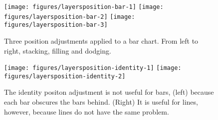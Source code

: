 \begin{Shaded}
\begin{Highlighting}[]
\StringTok{ } 
\StringTok{ }\NormalTok{(} \NormalTok{)}
\StringTok{ }\NormalTok{(} \NormalTok{)}
\StringTok{ }\NormalTok{(} \NormalTok{)}
\end{Highlighting}
\end{Shaded}

\begin{figure}
\texttt{[image: figures/layersposition-bar-1]} \texttt{[image: figures/layersposition-bar-2]} \texttt{[image: figures/layersposition-bar-3]} \caption{Three position adjustments applied to a bar chart.  From left to right, stacking, filling and dodging.\label{fig:position-bar}}
\end{figure}

\begin{Shaded}
\begin{Highlighting}[]
\StringTok{ }\NormalTok{(} \NormalTok{)}
 \NormalTok{, } 
  \NormalTok{, }
\end{Highlighting}
\end{Shaded}

\begin{figure}
\texttt{[image: figures/layersposition-identity-1]} \texttt{[image: figures/layersposition-identity-2]} \caption{The identity positon adjustment is not useful for bars, (left) because each bar obscures the bars behind.  (Right) It is useful for lines, however, because lines do not have the same problem.\label{fig:position-identity}}
\end{figure}


